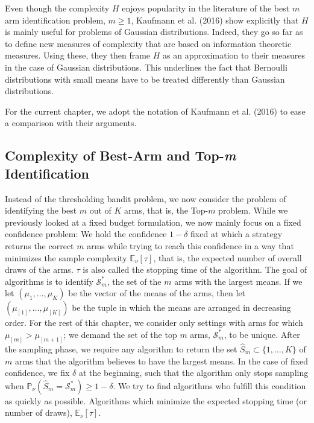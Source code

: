 \documentclass[12pt,]{article}
\begin{document}
Even though the complexity \(H\) enjoys popularity in the literature of
the best \(m\) arm identification problem, \(m \geq 1\), Kaufmann et al.
(2016) show explicitly that \(H\) is mainly useful for problems of
Gaussian distributions. Indeed, they go so far as to define new measures
of complexity that are based on information theoretic measures. Using
these, they then frame \(H\) as an approximation to their measures in
the case of Gaussian distributions. This underlines the fact that
Bernoulli distributions with small means have to be treated differently
than Gaussian distributions.

For the current chapter, we adopt the notation of Kaufmann et al. (2016)
to ease a comparison with their arguments.

\subsection{\texorpdfstring{Complexity of Best-Arm and Top-\emph{m}
Identification}{Complexity of Best-Arm and Top-m Identification}}\label{complexity-of-best-arm-and-top-m-identification}

Instead of the thresholding bandit problem, we now consider the problem
of identifying the best \(m\) out of \(K\) arms, that is, the Top-\(m\)
problem. While we previously looked at a fixed budget formulation, we
now mainly focus on a fixed confidence problem: We hold the confidence
\(1-\delta\) fixed at which a strategy returns the correct \(m\) arms
while trying to reach this confidence in a way that minimizes the sample
complexity \(\mathbb{E}_{\nu}[\tau]\), that is, the expected number of
overall draws of the arms. \(\tau\) is also called the stopping time of
the algorithm. The goal of algorithms is to identify
\(\mathcal{S}_m^*\), the set of the \(m\) arms with the largest means.
If we let \((\mu_1, \dots, \mu_K)\) be the vector of the means of the
arms, then let \((\mu_{[1]}, \dots, \mu_{[K]})\) be the tuple in which
the means are arranged in decreasing order. For the rest of this
chapter, we consider only settings with arms for which
\(\mu_{[m]} > \mu_{[m+1]}\); we demand the set of the top \(m\) arms,
\(\mathcal{S}_m^*\), to be unique. After the sampling phase, we require
any algorithm to return the set \(\hat{S}_m \subset \{1,\dots,K\}\) of
\(m\) arms that the algorithm believes to have the largest means. In the
case of fixed confidence, we fix \(\delta\) at the beginning, such that
the algorithm only stops sampling when
\(\mathbb{P}_{\nu}(\hat{S}_m = \mathcal{S}_m^*) \geq 1-\delta\). We try
to find algorithms who fulfill this condition as quickly as possible.
Algorithms which minimize the expected stopping time (or number of
draws), \(\mathbb{E}_{\nu}[\tau]\).
\end{document}
